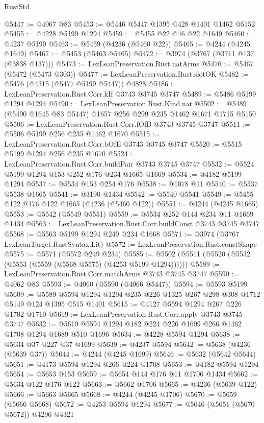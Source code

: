 \begin{lexlean}{RustStd}
\begin{coremodule}
@5447 := @4067 @83
@5453 := @5446 @5447 @1395 @428 @1401 @1462 @5152
@5455 := @4228 @5199 @1294
@5459 := @5455 @22 @46 @22 @1649
@5460 := @4237 @5199
@5463 := @5459 (@4236 (@5460 @22))
@5465 := @4244 (@4245 @1649)
@5467 := @5453 (@5463 @5465)
@5472 := @3974 (@3767 (@3711 @137 (@3838 @137)))
@5473 := LexLeanPreservation.Rust.natArms
@5476 := @5467 (@5472 (@5473 @303))
@5477 := LexLeanPreservation.Rust.slotOK
@5482 := @5476 (@4315 (@5477 @5199 @5447)) @4828
@5486 := LexLeanPreservation.Rust.Corr.kIf @3743 @3745 @3747
@5489 := @5486 @5199 @1294 @1294
@5490 := LexLeanPreservation.Rust.Kind.nat
@5502 := @5489 (@5490 @1645 @83 @5447) @1657 @256 @299 @235 @1462 @1671 @1715 @5150
@5506 := LexLeanPreservation.Rust.Corr.fOfB @3743 @3745 @3747
@5511 := @5506 @5199 @256 @235 @1462 @1670
@5515 := LexLeanPreservation.Rust.Corr.bOfE @3743 @3745 @3747
@5520 := @5515 @5199 @1294 @256 @235 @1670
@5524 := LexLeanPreservation.Rust.Corr.buildPair @3743 @3745 @3747
@5532 := @5524 @5199 @1294 @153 @252 @176 @234 @1665 @1669
@5534 := @4182 @5199 @1294
@5537 := @5534 @153 @254 @176
@5538 := @1078 @11
@5540 := @5537 @5538 @1665
@5541 := @3190 @1434
@5542 := @5540 @5541
@5549 := @5455 @122 @176 @122 @1665 (@4236 (@5460 @122))
@5551 := @4244 (@4245 @1665)
@5553 := @5542 (@5549 @5551)
@5559 := @5534 @252 @144 @234 @11 @1669 @1434
@5563 := LexLeanPreservation.Rust.Corr.buildConst @3743 @3745 @3747
@5568 := @5563 @5199 @1294 @249 @234 @1668
@5571 := @3974 (@3767 LexLeanTarget.RustSyntax.Lit)
@5572 := LexLeanPreservation.Rust.constShape
@5575 := @5571 (@5572 @249 @234)
@5585 := @5502 (@5511 (@5520 (@5532 (@5553 (@5559 (@5568 @5575) (@4253 @5199 @1294))))))
@5589 := LexLeanPreservation.Rust.Corr.matchArms @3743 @3745 @3747
@5590 := @4062 @83
@5593 := @4060 (@5590 (@4066 @5447))
@5594 := @5593 @5199
@5609 := @5589 @5594 @1294 @1294 @235 @226 @1325 @267 @298 @308 @1712 @5149 @124 @1395 @515 @1401
@5615 := @4127 @5594 @1294 @267 @226 @1702 @1710
@5619 := LexLeanPreservation.Rust.Corr.apply @3743 @3745 @3747
@5632 := @5619 @5594 @1294 @182 @224 @226 @1699 @266 @1462 @1708 @1294 @1689 @510 @1696
@5634 := @4228 @5594 @1294
@5638 := @5634 @37 @227 @37 @1699
@5639 := @4237 @5594
@5642 := @5638 (@4236 (@5639 @37))
@5644 := @4244 (@4245 @1699)
@5646 := @5632 (@5642 @5644)
@5651 := @4173 @5594 @1294 @266 @224 @1708
@5653 := @4182 @5594 @1294
@5654 := @5653 @153
@5659 := @5654 @144 @176 @11 @1706 @1434
@5662 := @5634 @122 @176 @122
@5663 := @5662 @1706
@5665 := @4236 (@5639 @122)
@5666 := @5663 @5665
@5668 := @4244 (@4245 @1706)
@5670 := @5659 (@5666 @5668)
@5672 := @4253 @5594 @1294
@5677 := @5646 (@5651 (@5670 @5672)) @4296 @4321

\end{coremodule}
\end{lexlean}
